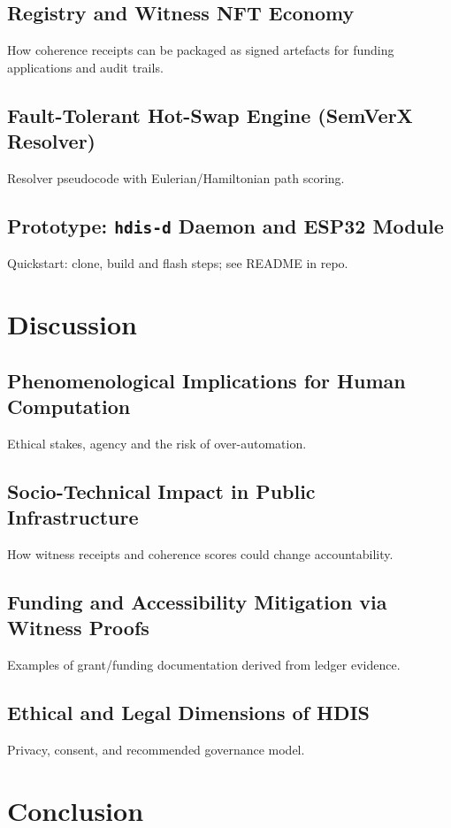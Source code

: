 \documentclass[12pt,a4paper]{article}
\begin{document}
\subsection{Registry and Witness NFT Economy}
How coherence receipts can be packaged as signed artefacts for funding
applications and audit trails.

\subsection{Fault-Tolerant Hot-Swap Engine (SemVerX Resolver)}
Resolver pseudocode with Eulerian/Hamiltonian path scoring.

\subsection{Prototype: \texttt{hdis-d} Daemon and ESP32 Module}
Quickstart: clone, build and flash steps; see README in repo.

\section{Discussion}
\subsection{Phenomenological Implications for Human Computation}
Ethical stakes, agency and the risk of over-automation.

\subsection{Socio-Technical Impact in Public Infrastructure}
How witness receipts and coherence scores could change accountability.

\subsection{Funding and Accessibility Mitigation via Witness Proofs}
Examples of grant/funding documentation derived from ledger evidence.

\subsection{Ethical and Legal Dimensions of HDIS}
Privacy, consent, and recommended governance model.

\section{Conclusion}
\end{document}

